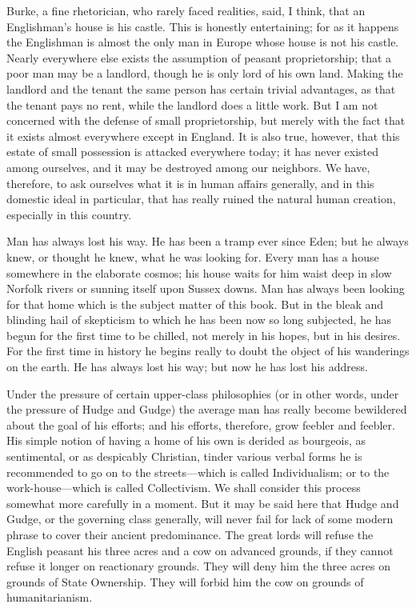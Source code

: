 \documentclass{book}
\begin{document}
Burke, a fine rhetorician, who rarely faced realities, said, I think, that an Englishman’s house is his castle. This is honestly entertaining; for as it happens the Englishman is almost the only man in Europe whose house is not his castle. Nearly everywhere else exists the assumption of peasant proprietorship; that a poor man may be a landlord, though he is only lord of his own land. Making the landlord and the tenant the same person has certain trivial advantages, as that the tenant pays no rent, while the landlord does a little work. But I am not concerned with the defense of small proprietorship, but merely with the fact that it exists almost everywhere except in England. It is also true, however, that this estate of small possession is attacked everywhere today; it has never existed among ourselves, and it may be destroyed among our neighbors. We have, therefore, to ask ourselves what it is in human affairs generally, and in this domestic ideal in particular, that has really ruined the natural human creation, especially in this country.

Man has always lost his way. He has been a tramp ever since Eden; but he always knew, or thought he knew, what he was looking for. Every man has a house somewhere in the elaborate cosmos; his house waits for him waist deep in slow Norfolk rivers or sunning itself upon Sussex downs. Man has always been looking for that home which is the subject matter of this book. But in the bleak and blinding hail of skepticism to which he has been now so long subjected, he has begun for the first time to be chilled, not merely in his hopes, but in his desires. For the first time in history he begins really to doubt the object of his wanderings on the earth. He has always lost his way; but now he has lost his address.

Under the pressure of certain upper-class philosophies (or in other words, under the pressure of Hudge and Gudge) the average man has really become bewildered about the goal of his efforts; and his efforts, therefore, grow feebler and feebler. His simple notion of having a home of his own is derided as bourgeois, as sentimental, or as despicably Christian, tinder various verbal forms he is recommended to go on to the streets—which is called Individualism; or to the work-house—which is called Collectivism. We shall consider this process somewhat more carefully in a moment. But it may be said here that Hudge and Gudge, or the governing class generally, will never fail for lack of some modern phrase to cover their ancient predominance. The great lords will refuse the English peasant his three acres and a cow on advanced grounds, if they cannot refuse it longer on reactionary grounds. They will deny him the three acres on grounds of State Ownership. They will forbid him the cow on grounds of humanitarianism.
\end{document}
